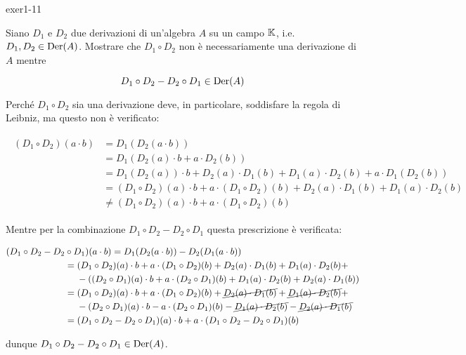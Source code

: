 
{exer1-11}
{
Siano $ D_{1} $ e $ D_{2} $ due derivazioni di un'algebra $ A $ su un campo $ \mathbb{K} $, i.e. $ D_{1},D_{2} \in \operatorname{Der}(A) $. Mostrare che $ D_{1} \circ D_{2} $ non è necessariamente una derivazione di $ A $ mentre

\begin{equation}
	D_{1} \circ D_{2} - D_{2} \circ D_{1} \in \operatorname{Der}(A)
\end{equation}
}
{
Perché $ D_{1} \circ D_{2} $ sia una derivazione deve, in particolare, soddisfare la regola di Leibniz, ma questo non è verificato:

\begin{align}
	\begin{split}
		(D_{1} \circ D_{2})(a \cdot b) &= D_{1}(D_{2}(a \cdot b)) \\
		&= D_{1}( D_{2}(a) \cdot b + a \cdot D_{2}(b) ) \\
		&= D_{1}(D_{2}(a)) \cdot b + D_{2}(a) \cdot D_{1}(b) + D_{1}(a) \cdot D_{2}(b) + a \cdot D_{1}(D_{2}(b)) \\
		&= (D_{1} \circ D_{2})(a) \cdot b + a \cdot (D_{1} \circ D_{2})(b) + D_{2}(a) \cdot D_{1}(b) + D_{1}(a) \cdot D_{2}(b) \\
		&\neq (D_{1} \circ D_{2})(a) \cdot b + a \cdot (D_{1} \circ D_{2})(b)
	\end{split}
\end{align}

Mentre per la combinazione $ D_{1} \circ D_{2} - D_{2} \circ D_{1} $ questa prescrizione è verificata:

\begin{align}
	\begin{split}
		(D_{1} \circ D_{2} - D_{2} &\circ D_{1})(a \cdot b) = D_{1}(D_{2}(a \cdot b)) - D_{2}(D_{1}(a \cdot b)) \\
		&= (D_{1} \circ D_{2})(a) \cdot b + a \cdot (D_{1} \circ D_{2})(b) + D_{2}(a) \cdot D_{1}(b) + D_{1}(a) \cdot D_{2}(b) + \\
		& \hal - ((D_{2} \circ D_{1})(a) \cdot b + a \cdot (D_{2} \circ D_{1})(b) + D_{1}(a) \cdot D_{2}(b) + D_{2}(a) \cdot D_{1}(b)) \\
		&= (D_{1} \circ D_{2})(a) \cdot b + a \cdot (D_{1} \circ D_{2})(b) + \cancel{ D_{2}(a) \cdot D_{1}(b) } + \cancel{ D_{1}(a) \cdot D_{2}(b) } + \\
		& \hal - (D_{2} \circ D_{1})(a) \cdot b - a \cdot (D_{2} \circ D_{1})(b) - \cancel{ D_{1}(a) \cdot D_{2}(b) } - \cancel{ D_{2}(a) \cdot D_{1}(b) } \\
		&= (D_{1} \circ D_{2} - D_{2} \circ D_{1})(a) \cdot b + a \cdot (D_{1} \circ D_{2} - D_{2} \circ D_{1})(b)
	\end{split}
\end{align}

dunque $ D_{1} \circ D_{2} - D_{2} \circ D_{1} \in \operatorname{Der}(A) $.
}
